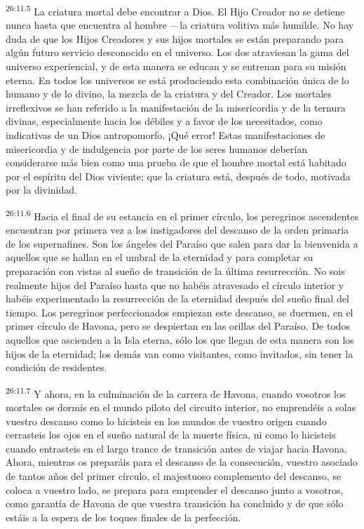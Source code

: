 \par
\textsuperscript{26:11.5} La criatura mortal debe encontrar a Dios. El Hijo Creador no se detiene nunca hasta que encuentra al hombre ---la criatura volitiva más humilde. No hay duda de que los Hijos Creadores y sus hijos mortales se están preparando para algún futuro servicio desconocido en el universo. Los dos atraviesan la gama del universo experiencial, y de esta manera se educan y se entrenan para su misión eterna. En todos los universos se está produciendo esta combinación única de lo humano y de lo divino, la mezcla de la criatura y del Creador. Los mortales irreflexivos se han referido a la manifestación de la misericordia y de la ternura divinas, especialmente hacia los débiles y a favor de los necesitados, como indicativas de un Dios antropomorfo. ¡Qué error! Estas manifestaciones de misericordia y de indulgencia por parte de los seres humanos deberían considerarse más bien como una prueba de que el hombre mortal está habitado por el espíritu del Dios viviente; que la criatura está, después de todo, motivada por la divinidad.

\par
\textsuperscript{26:11.6} Hacia el final de su estancia en el primer círculo, los peregrinos ascendentes encuentran por primera vez a los instigadores del descanso de la orden primaria de los supernafines. Son los ángeles del Paraíso que salen para dar la bienvenida a aquellos que se hallan en el umbral de la eternidad y para completar su preparación con vistas al sueño de transición de la última resurrección. No sois realmente hijos del Paraíso hasta que no habéis atravesado el círculo interior y habéis experimentado la resurrección de la eternidad después del sueño final del tiempo. Los peregrinos perfeccionados empiezan este descanso, se duermen, en el primer círculo de Havona, pero se despiertan en las orillas del Paraíso. De todos aquellos que ascienden a la Isla eterna, sólo los que llegan de esta manera son los hijos de la eternidad; los demás van como visitantes, como invitados, sin tener la condición de residentes.

\par
\textsuperscript{26:11.7} Y ahora, en la culminación de la carrera de Havona, cuando vosotros los mortales os dormís en el mundo piloto del circuito interior, no emprendéis a solas vuestro descanso como lo hicisteis en los mundos de vuestro origen cuando cerrasteis los ojos en el sueño natural de la muerte física, ni como lo hicisteis cuando entrasteis en el largo trance de transición antes de viajar hacia Havona. Ahora, mientras os preparáis para el descanso de la consecución, vuestro asociado de tantos años del primer círculo, el majestuoso complemento del descanso, se coloca a vuestro lado, se prepara para emprender el descanso junto a vosotros, como garantía de Havona de que vuestra transición ha concluido y de que sólo estáis a la espera de los toques finales de la perfección.

